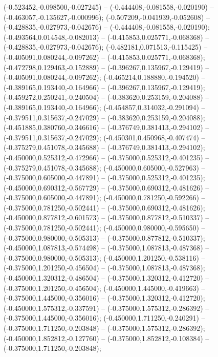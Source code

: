  (-0.523452,-0.098500,-0.027245) -- (-0.444408,-0.081558,-0.020190) -- (-0.463057,-0.135627,-0.000996);
 (-0.507209,-0.041939,-0.052608) -- (-0.428835,-0.027973,-0.042676) -- (-0.444408,-0.081558,-0.020190);
 (-0.493564,0.014548,-0.082013) -- (-0.415853,0.025771,-0.068368) -- (-0.428835,-0.027973,-0.042676);
 (-0.482181,0.071513,-0.115425) -- (-0.405091,0.080244,-0.097262) -- (-0.415853,0.025771,-0.068368);
 (-0.472798,0.129463,-0.152889) -- (-0.396267,0.135967,-0.129419) -- (-0.405091,0.080244,-0.097262);
 (-0.465214,0.188880,-0.194520) -- (-0.389165,0.193440,-0.164966) -- (-0.396267,0.135967,-0.129419);
 (-0.459272,0.250241,-0.240504) -- (-0.383620,0.253159,-0.204088) -- (-0.389165,0.193440,-0.164966);
 (-0.454857,0.314032,-0.291094) -- (-0.379511,0.315637,-0.247029) -- (-0.383620,0.253159,-0.204088);
 (-0.451885,0.380760,-0.346616) -- (-0.376749,0.381413,-0.294102) -- (-0.379511,0.315637,-0.247029);
 (-0.450301,0.450968,-0.407474) -- (-0.375279,0.451078,-0.345688) -- (-0.376749,0.381413,-0.294102);
 (-0.450000,0.525312,-0.472966) -- (-0.375000,0.525312,-0.401235) -- (-0.375279,0.451078,-0.345688);
 (-0.450000,0.605000,-0.527963) -- (-0.375000,0.605000,-0.447891) -- (-0.375000,0.525312,-0.401235);
 (-0.450000,0.690312,-0.567729) -- (-0.375000,0.690312,-0.481626) -- (-0.375000,0.605000,-0.447891);
 (-0.450000,0.781250,-0.592266) -- (-0.375000,0.781250,-0.502441) -- (-0.375000,0.690312,-0.481626);
 (-0.450000,0.877812,-0.601573) -- (-0.375000,0.877812,-0.510337) -- (-0.375000,0.781250,-0.502441);
 (-0.450000,0.980000,-0.595650) -- (-0.375000,0.980000,-0.505313) -- (-0.375000,0.877812,-0.510337);
 (-0.450000,1.087813,-0.574498) -- (-0.375000,1.087813,-0.487368) -- (-0.375000,0.980000,-0.505313);
 (-0.450000,1.201250,-0.538116) -- (-0.375000,1.201250,-0.456504) -- (-0.375000,1.087813,-0.487368);
 (-0.450000,1.320312,-0.486504) -- (-0.375000,1.320312,-0.412720) -- (-0.375000,1.201250,-0.456504);
 (-0.450000,1.445000,-0.419663) -- (-0.375000,1.445000,-0.356016) -- (-0.375000,1.320312,-0.412720);
 (-0.450000,1.575312,-0.337591) -- (-0.375000,1.575312,-0.286392) -- (-0.375000,1.445000,-0.356016);
 (-0.450000,1.711250,-0.240291) -- (-0.375000,1.711250,-0.203848) -- (-0.375000,1.575312,-0.286392);
 (-0.450000,1.852812,-0.127760) -- (-0.375000,1.852812,-0.108384) -- (-0.375000,1.711250,-0.203848);
